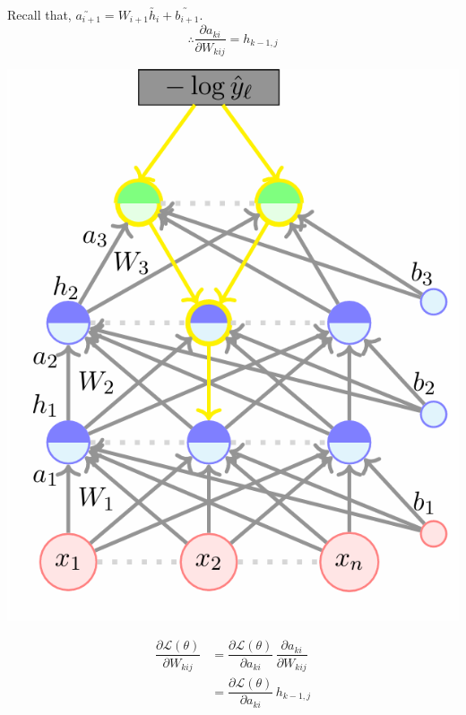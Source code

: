 \documentclass[11pt, a4paper]{article}
\begin{document}
\noindent
\begin{minipage}{0.5\textwidth}
Recall that, $\utilde{a_{i+1}} = W_{i+1} \utilde{h_i} + \utilde{b_{i+1}}$. \\[1.5em]
$$\therefore \dfrac{\partial a_{ki}}{\partial W_{kij}} = h_{k-1,j}$$
\end{minipage}
\hfill
\begin{minipage}{0.45\textwidth}
    \includegraphics[scale = 0.5]{image_12.png}
\end{minipage}

\begin{align*}
\dfrac{\partial \mathscr{L}(\theta)}{\partial W_{kij}}
&= \dfrac{\partial \mathscr{L}(\theta)}{\partial a_{ki}} \, \dfrac{\partial a_{ki}}{\partial W_{kij}} \\[1.5em]
&= \dfrac{\partial \mathscr{L}(\theta)}{\partial a_{ki}} \, h_{k-1,j}
\end{align*}

\vspace{0.3cm}
\end{document}
